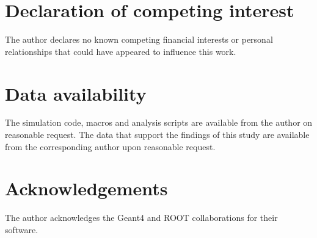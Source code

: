 \documentclass[preprint,12pt]{elsarticle}
\newcommand{\gfour}{Geant4}
\begin{document}
\section*{Declaration of competing interest}
The author declares no known competing financial interests or personal
relationships that could have appeared to influence this work.

\section*{Data availability}
The simulation code, macros and analysis scripts are available from the author
on reasonable request. The data that support the findings of this study are
available from the corresponding author upon reasonable request.

\section*{Acknowledgements}
The author acknowledges the \gfour{} and ROOT collaborations for their software.

\FloatBarrier


\end{document}
